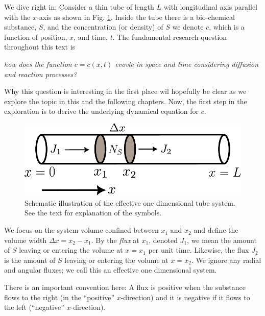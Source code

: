 

We dive right in: Consider a thin tube of length $L$ with longitudinal axis parallel
with the $x$-axis as shown in Fig. \ref{fig:flux}. Inside
the tube there is a bio-chemical substance, $S$, and  the concentration (or density) of $S$ we denote 
$c$, which is a function of position, $x$, and time, $t$. The fundamental research question 
throughout this text is
\begin{center}
	\emph{how does the function $c=c(x,t)$ evovle in space and time  
	considering diffusion and reaction processes?}
\end{center}
Why this question is interesting in the first place wil hopefully be clear
as we explore the topic in this and the following chapters. Now, 
the first step in the exploration is to derive the underlying dynamical equation for $c$.

\begin{figure}[b]
	\begin{center}
		\includegraphics[scale=0.5]{figs/fluxIllustration.pdf}
		\caption{\label{fig:flux}
		Schematic illustration of the effective one dimensional tube system. See the text for 
		explanation of the symbols.
		}
	\end{center}
\end{figure}

We focus on the system volume confined between $x_1$ and $x_2$ and define the 
volume width $\Delta x = x_2 - x_1$. By the \emph{flux} at $x_1$, denoted
$J_1$, we mean the amount of $S$ leaving or entering the volume at $x=x_1$ per
unit time. Likewise, the flux $J_2$ is the amount of $S$ leaving or entering the
volume at $x=x_2$. We ignore any radial and angular fluxes; we call this an effective 
one dimensional system.

There is an important convention here: A flux is positive when the substance flows to the
right (in the ``positive'' $x$-direction) and it is negative if it flows to the
left (``negative'' $x$-direction). 

